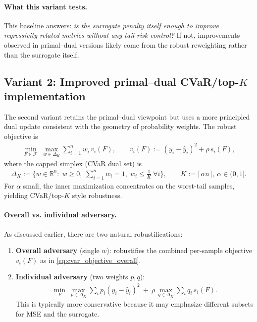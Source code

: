 \documentclass[11pt]{article}
\theoremstyle{plain}
\theoremstyle{definition}
\newcommand{\1}{\mathbf{1}}
\begin{document}
\paragraph{What this variant tests.}
This baseline answers: \emph{is the surrogate penalty itself enough to improve regressivity-related metrics without any tail-risk control?}
If not, improvements observed in primal--dual versions likely come from the robust reweighting rather than the surrogate itself.

\subsection{Variant 2: Improved primal--dual CVaR/top-$K$ implementation}
\label{subsec:pd_improved}

The second variant retains the primal--dual viewpoint but uses a more principled dual update consistent with the geometry of probability weights. The robust objective is
\begin{align}
\min_{F\in\mathcal{F}}\; \max_{w\in \Delta_{K}} \sum_{i=1}^n w_i\, v_i(F),
\qquad v_i(F):=(y_i-\hat y_i)^2 + \rho\, s_i(F),
\label{eq:cvar_objective_overall}
\end{align}
where the capped simplex (CVaR dual set) is
\begin{align}
\Delta_K := \Big\{w\in\mathbb{R}^n:\; w\ge 0,\; \sum_{i=1}^n w_i = 1,\; w_i \le \tfrac{1}{K}\ \forall i\Big\},
\qquad K := \lceil \alpha n\rceil,\ \alpha\in(0,1].
\label{eq:capped_simplex}
\end{align}
For $\alpha$ small, the inner maximization concentrates on the worst-tail samples, yielding CVaR/top-$K$ style robustness.

\paragraph{Overall vs. individual adversary.}
As discussed earlier, there are two natural robustifications:
\begin{enumerate}
  \item \textbf{Overall adversary} (single $w$): robustifies the combined per-sample objective $v_i(F)$ as in \eqref{eq:cvar_objective_overall}.
  \item \textbf{Individual adversary} (two weights $p,q$):
  \begin{align}
  \min_F\ \max_{p\in\Delta_K}\sum_i p_i (y_i-\hat y_i)^2\ +\ \rho\,\max_{q\in\Delta_K}\sum_i q_i\, s_i(F).
  \label{eq:cvar_objective_individual}
  \end{align}
  This is typically more conservative because it may emphasize different subsets for MSE and the surrogate.
\end{enumerate}
\end{document}
